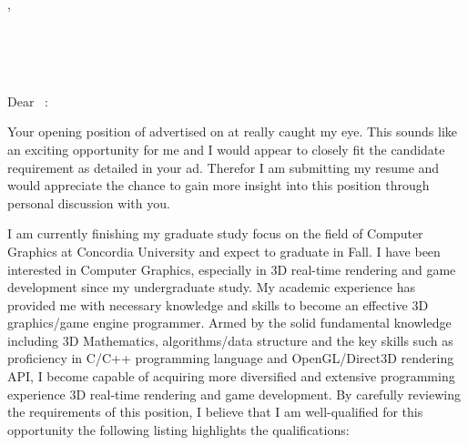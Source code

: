 \documentclass[11pt]{letter}
\begin{document}
\begin{letter}{
    \clcontacttile\ \clcontactname  \\
    \clcontactposition              \\
    \clcompanyname                  \\
    \clcompanyaddr                  \\
    \clcompanycity,\ \clcompanyprov \\
    \clcompanyzip} 

\begin{center}
\large\bf 
\clmyname                           \\ 

\clmyaddr                           \\
\clmyemail                          \\
\clmyphone
\end{center} 

\vfill %
 
\opening{Dear \clcontacttitle\ \clcontactname:} 

Your opening position of \cljobpostedtitle advertised on \cljobposteddate at \cljobpostedplace really caught my eye. This sounds like an exciting opportunity for me and I would appear to closely fit the candidate requirement as detailed in your ad. Therefor I am submitting my resume and would appreciate the chance to gain more insight into this position through personal discussion with you.      

I am currently finishing my graduate study focus on the field of Computer Graphics at Concordia University and expect to graduate in Fall. I have been interested in Computer Graphics, especially in 3D real-time rendering and game development since my undergraduate study. My academic experience has provided me with necessary knowledge and skills to become an effective 3D graphics/game engine programmer. Armed by the solid fundamental knowledge including 3D Mathematics, algorithms/data structure and the key skills such as proficiency in C/C++ programming language and OpenGL/Direct3D rendering API, I become capable of acquiring more diversified and extensive programming experience 3D real-time rendering and game development. By carefully reviewing the requirements of this position, I believe that I am well-qualified for this opportunity the following listing highlights the qualifications:

\end{letter}
\end{document}
